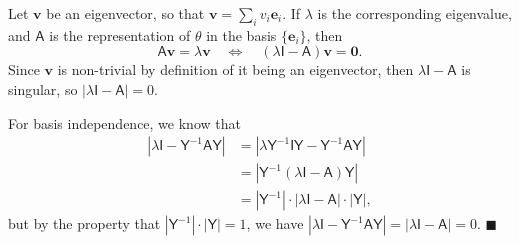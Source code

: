 \documentclass[letter-paper]{tufte-book}
\newenvironment{proof}[1][Proof]{\begin{trivlist}
\item[\hskip \labelsep {\bfseries #1}]}{\end{trivlist}}
\newcommand{\qed}{\hfill$\blacksquare$}
\begin{document}
\begin{proof}
  Let $\boldsymbol{v}$ be an eigenvector, so that $\boldsymbol{v}=\sum_i
  v_i\boldsymbol{e}_i$. If $\lambda$ is the corresponding eigenvalue, and
  $\textsf{A}$ is the representation of $\theta$ in the basis
  $\{\boldsymbol{e}_i\}$, then
  \begin{equation*}
    \mathsf{A}\boldsymbol{v} = \lambda\boldsymbol{v} \quad \Leftrightarrow \quad (\lambda\mathsf{I} - \mathsf{A})\boldsymbol{v} = \boldsymbol{0}.
  \end{equation*}
  Since $\boldsymbol{v}$ is non-trivial by definition of it being an
  eigenvector, then $\lambda\mathsf{I} - \mathsf{A}$ is singular, so
  $|\lambda\mathsf{I} - \mathsf{A}| = 0$.
  
  For basis independence, we know that
  \begin{align*}
    |\lambda\mathsf{I} - \mathsf{Y}^{-1}\mathsf{A}\mathsf{Y}| &= |\lambda\mathsf{Y}^{-1}\mathsf{I}\mathsf{Y} - \mathsf{Y}^{-1}\mathsf{A}\mathsf{Y}| \\
      & = |\mathsf{Y}^{-1}(\lambda\mathsf{I}- \mathsf{A})\mathsf{Y}|\\
      & = |\mathsf{Y}^{-1}| \cdot |\lambda\mathsf{I}- \mathsf{A}| \cdot |\mathsf{Y}|,
  \end{align*}
  but by the property that $|\mathsf{Y}^{-1}| \cdot |\mathsf{Y}| = 1$, we have
  $|\lambda\mathsf{I} - \mathsf{Y}^{-1}\mathsf{A}\mathsf{Y}| =
  |\lambda\mathsf{I}- \mathsf{A}| = 0$. \qed
\end{proof}
\end{document}

